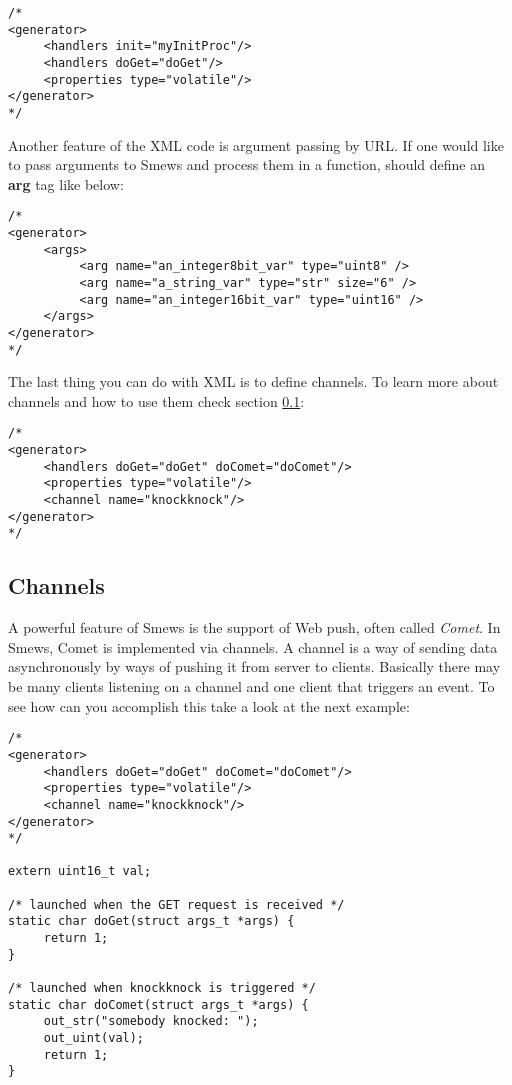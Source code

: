 \documentclass{report}
\begin{document}
\begin{verbatim}
/*
<generator>
     <handlers init="myInitProc"/>
     <handlers doGet="doGet"/>
     <properties type="volatile"/>
</generator>
*/
\end{verbatim}

Another feature of the XML code is argument passing by URL. If one would like to pass arguments to Smews
and process them in a function, should define an \textbf{arg} tag like below:
\begin{verbatim}
/*
<generator>
     <args>
          <arg name="an_integer8bit_var" type="uint8" />
          <arg name="a_string_var" type="str" size="6" />
          <arg name="an_integer16bit_var" type="uint16" />
     </args>
</generator>
*/
\end{verbatim}

The last thing you can do with XML is to define channels. To learn more about channels and how to use them check section \ref{subsub:channels}:
\begin{verbatim}
/*
<generator>
     <handlers doGet="doGet" doComet="doComet"/>
     <properties type="volatile"/>
     <channel name="knockknock"/>
</generator>
*/
\end{verbatim}

\subsection{Channels}
\label{subsub:channels}

A powerful feature of Smews is the support of Web push, often called \emph{Comet}. In Smews, Comet is implemented via channels. A channel is a way of sending data asynchronously by ways of pushing it from server to clients. Basically there may be many clients listening on a channel and one client that triggers an event. To see how can you accomplish this take a look at the next example:
\begin{verbatim}
/*
<generator>
     <handlers doGet="doGet" doComet="doComet"/>
     <properties type="volatile"/>
     <channel name="knockknock"/>
</generator>
*/

extern uint16_t val;

/* launched when the GET request is received */
static char doGet(struct args_t *args) {
     return 1;
}

/* launched when knockknock is triggered */
static char doComet(struct args_t *args) {
     out_str("somebody knocked: ");
     out_uint(val);
     return 1;
}
\end{verbatim}
\end{document}
